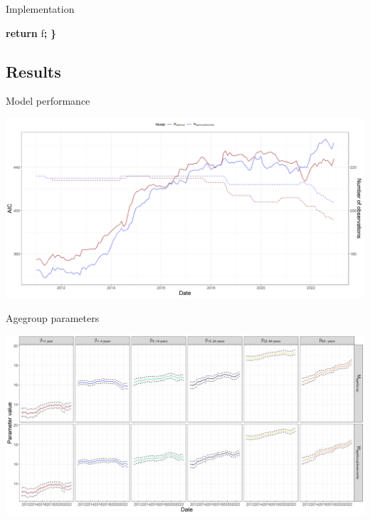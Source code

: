 \documentclass[aspectratio=169]{beamer}
\newenvironment{Shaded}{\begin{snugshade}}{\end{snugshade}}
\newcommand{\ControlFlowTok}[1]{\textcolor[rgb]{0.13,0.29,0.53}{\textbf{#1}}}
\newcommand{\NormalTok}[1]{#1}
\newcommand{\OperatorTok}[1]{\textcolor[rgb]{0.81,0.36,0.00}{\textbf{#1}}}
\begin{document}
\begin{frame}[fragile]{Implementation}
\begin{Shaded}
\begin{Highlighting}[]
  \ControlFlowTok{return}\NormalTok{ f}\OperatorTok{;}
\OperatorTok{\}}
\end{Highlighting}
\end{Shaded}

\normalsize
\end{frame}

\hypertarget{results}{%
\subsection{Results}\label{results}}

\begin{frame}{Model performance}
\protect\hypertarget{model-performance}{}
\tiny

\includegraphics[width=1\linewidth]{../figures/AICxSTEC_PoisN}

\normalsize
\end{frame}

\begin{frame}{Agegroup parameters}
\protect\hypertarget{agegroup-parameters}{}
\tiny

\includegraphics[width=1\linewidth]{../figures/ageGroupParxSTEC_PoisN}

\normalsize
\end{frame}
\end{document}
